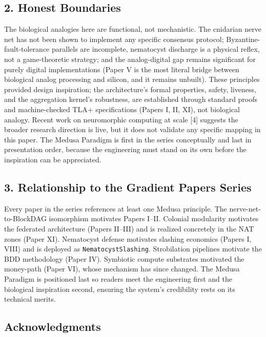 \subsection{2. Honest Boundaries}\label{honest-boundaries}

The biological analogies here are functional, not mechanistic. The
cnidarian nerve net has not been shown to implement any specific
consensus protocol; Byzantine-fault-tolerance parallels are incomplete,
nematocyst discharge is a physical reflex, not a game-theoretic
strategy; and the analog-digital gap remains significant for purely
digital implementations (Paper V is the most literal bridge between
biological analog processing and silicon, and it remains unbuilt). These
principles provided design inspiration; the architecture's formal
properties, safety, liveness, and the aggregation kernel's robustness,
are established through standard proofs and machine-checked TLA+
specifications (Papers I, II, XI), not biological analogy. Recent work
on neuromorphic computing at scale {[}4{]} suggests the broader research
direction is live, but it does not validate any specific mapping in this
paper. The Medusa Paradigm is first in the series conceptually and last
in presentation order, because the engineering must stand on its own
before the inspiration can be appreciated.

\subsection{3. Relationship to the Gradient Papers
Series}\label{relationship-to-the-gradient-papers-series}

Every paper in the series references at least one Medusa principle. The
nerve-net-to-BlockDAG isomorphism motivates Papers I--II. Colonial
modularity motivates the federated architecture (Papers II--III) and is
realized concretely in the NAT zones (Paper XI). Nematocyst defense
motivates slashing economics (Papers I, VIII) and is deployed as
\texttt{NematocystSlashing}. Strobilation pipelines motivate the BDD
methodology (Paper IV). Symbiotic compute substrates motivated the
money-path (Paper VI), whose mechanism has since changed. The Medusa
Paradigm is positioned last so readers meet the engineering first and
the biological inspiration second, ensuring the system's credibility
rests on its technical merits.

\subsection{Acknowledgments}\label{acknowledgments}

